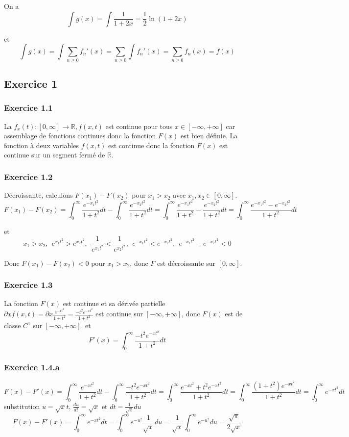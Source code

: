 \documentclass[]{book}
\theoremstyle{definition}
\newcommand{\bb}[1]{\mathbb{#1}}
\newcommand{\R}{\bb{R}}
\begin{document}
On a
$$\int {g(x)} = \int {\frac{1}{1+2x}} = \frac{1}{2}\ln(1+2x) $$ 

et 
$$
\int {g(x)} = \int {\sum_{n \ge 0}f_n'(x)} = \sum_{n \ge 0} \int {f_n'(x)} = \sum_{n \ge 0}f_n(x) = f(x)
$$



\subsection*{Exercice 1}
\subsubsection*{Exercice 1.1}
La $f_x(t): [0,\infty] \to \R, f(x,t)$ est continue pour tous $x \in [-\infty, +\infty]$ car assemblage de fonctions continues donc la fonction $F(x)$ est bien d\'efinie. La fonction \`a deux variables  $f(x,t)$ est continue donc la fonction $F(x)$ est continue sur un segment ferm\'e de $\R$. 

\subsubsection*{Exercice 1.2}
D\'ecroissante, calculons $F(x_1) - F(x_2)$ pour $x_1 > x_2$ avec $x_1, x_2 \in [0,\infty]$.
$$F(x_1) - F(x_2) = \int_{0}^{\infty}{\frac{e^{-x_1t^2}}{1+t^2}dt} - \int_{0}^{\infty}{\frac{e^{-x_2t^2}}{1+t^2}dt} = \int_{0}^{\infty}{\frac{e^{-x_1t^2}}{1+t^2} - \frac{e^{-x_2t^2}}{1+t^2}dt} = \int_{0}^{\infty}{\frac{e^{-x_1t^2} - e^{-x_2t^2}}{1+t^2}dt}$$

et 
$$ x_1 > x_2,\ \ e^{x_1t^2} > e^{x_2t^2},\ \ \frac{1}{e^{x_1t^2}} < \frac{1}{e^{x_2t^2}},\ \ e^{-x_1t^2} < e^{-x_2t^2},\ \ e^{-x_1t^2} - e^{-x_2t^2} < 0$$

Donc  $F(x_1) - F(x_2) < 0$ pour $x_1 > x_2$, donc $F$ est d\'ecroissante sur $[0,\infty]$.

\subsubsection*{Exercice 1.3}
La fonction $F(x)$ est continue et sa d\'eriv\'ee partielle $\partial x f(x,t) = \partial x \frac{e^{-xt^2}}{1+t^2} = \frac{-t^2e^{-xt^2}}{1+t^2}$ est continue sur $[-\infty, +\infty]$, donc $F(x)$ est de classe $C^1$ sur $[-\infty, +\infty]$.
et
$$
F'(x) = \int_{0}^{\infty}{\frac{-t^2e^{-xt^2}}{1+t^2}dt}
$$

\subsubsection*{Exercice 1.4.a}
$$
F(x)-F'(x) = \int_{0}^{\infty}{\frac{e^{-xt^2}}{1+t^2}dt} - \int_{0}^{\infty}{\frac{-t^2e^{-xt^2}}{1+t^2}dt} = \int_{0}^{\infty}{\frac{e^{-xt^2}+t^2e^{-xt^2}}{1+t^2}dt} = \int_{0}^{\infty}{\frac{(1+t^2)e^{-xt^2}}{1+t^2}dt} = \int_{0}^{\infty}{e^{-xt^2}dt}
$$
substitution $u=\sqrt{x}t$,  $\frac{du}{dt}=\sqrt{x}$ et $dt = \frac{1}{\sqrt{x}}du$
$$
F(x)-F'(x) = \int_{0}^{\infty}{e^{-xt^2}dt} = \int_{0}^{\infty}{e^{-u^2}\frac{1}{\sqrt{x}}du} = \frac{1}{\sqrt{x}}\int_{0}^{\infty}{e^{-u^2}du} = \frac{\sqrt{\pi}}{2\sqrt{x}}
$$
\end{document}
